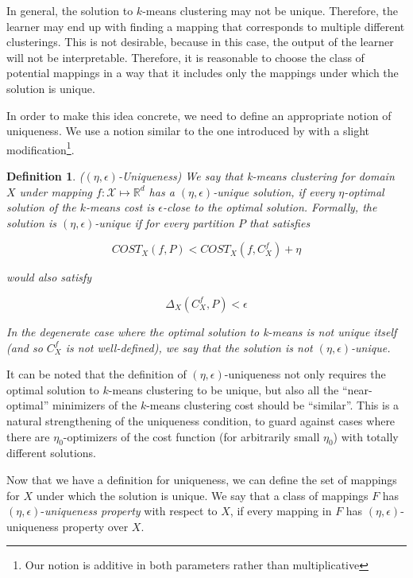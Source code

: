 \documentclass[letterpaper,12pt,titlepage,oneside,final]{book}
\newtheorem{definition}{Definition}
\begin{document}
In general, the solution to $k$-means clustering may not be unique. Therefore, the learner may end up with finding a mapping that corresponds to multiple different clusterings. This is not desirable, because in this case, the output of the learner will not be interpretable. Therefore, it is reasonable to choose the class of potential mappings in a way that it includes only the mappings under which the solution is unique. 

In order to make this idea concrete, we need to define an appropriate notion of uniqueness. We use a notion similar to the one introduced by \cite{balcan2009approximate} with a slight modification\footnote{Our notion is additive in both parameters rather than multiplicative}.


\begin{definition} {($(\eta, \epsilon)$-Uniqueness)} We say that k-means clustering for domain $X$ under mapping $f:\mathcal{X}\mapsto \mathbb{R}^d$ has a $(\eta, \epsilon)$-unique solution, if every $\eta$-optimal solution of the $k$-means cost is $\epsilon$-close to the optimal solution. Formally, the solution is $(\eta, \epsilon)$-unique if for every partition $P$ that satisfies

\begin{equation}
COST_{X}(f, P) < COST_{X}(f, C^{f}_X) + \eta
\end{equation}

would also satisfy

\begin{equation}
\Delta_{X}(C^{f}_X, P ) < \epsilon
\end{equation}

In the degenerate case where the optimal solution to k-means is not unique itself (and so $C^{f}_{X}$ is not well-defined), we say that the solution is not $(\eta, \epsilon)$-unique.

\end{definition}

It can be noted that the definition of $(\eta, \epsilon)$-uniqueness not only requires the optimal solution to $k$-means clustering to be unique, but also all the ``near-optimal'' minimizers of the $k$-means clustering cost should be ``similar''. This is a natural strengthening of the uniqueness condition, to guard against cases where there are $\eta_0$-optimizers of the cost function (for arbitrarily small $\eta_0$) with totally different solutions. 


Now that we have a definition for uniqueness, we can define the set of mappings for $X$ under which the solution is unique. We say that a class of mappings $F$ has $(\eta, \epsilon)$-\textit{uniqueness property} with respect to $X$, if every mapping in $F$ has $(\eta, \epsilon)$-uniqueness property over $X$.
\end{document}

